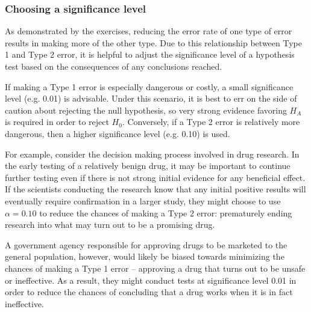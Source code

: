 \begin{spacing}{1.5}

\subsubsection{Choosing a significance level}

As demonstrated by the exercises, reducing the error rate of one type of error results in making more of the other type. Due to this relationship between Type 1 and Type 2 error, it is helpful to adjust the significance level of a hypothesis test based on the consequences of any conclusions reached.

\label{significanceLevel}


If making a Type 1 error is especially dangerous or costly, a small significance level (e.g. 0.01) is advisable. Under this scenario, it is best to err on the side of caution about rejecting the null hypothesis, so very strong evidence favoring $H_A$ is required in order to reject $H_0$. Conversely, if a Type 2 error is relatively more dangerous, then a higher significance level (e.g. 0.10) is used. 

For example, consider the decision making process involved in drug research. In the early testing of a relatively benign drug, it may be important to continue further testing even if there is not strong initial evidence for any beneficial effect. If the scientists conducting the research know that any initial positive results will eventually require confirmation in a larger study, they might choose to use $\alpha = 0.10$ to reduce the chances of making a Type 2 error: prematurely ending research into what may turn out to be a promising drug. 

A government agency responsible for approving drugs to be marketed to the general population, however, would likely be biased towards minimizing the chances of making a Type 1 error -- approving a drug that turns out to be unsafe or ineffective. As a result, they might conduct tests at significance level 0.01 in order to reduce the chances of concluding that a drug works when it is in fact ineffective. 



\end{spacing}
